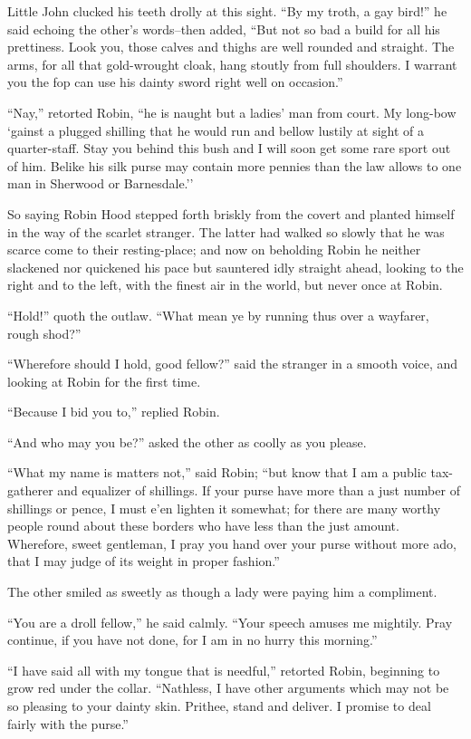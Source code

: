 Little John clucked his teeth drolly at this sight. ``By my troth, a gay
bird!'' he said echoing the other's words--then added, ``But not so bad
a build for all his prettiness. Look you, those calves and thighs are
well rounded and straight. The arms, for all that gold-wrought cloak,
hang stoutly from full shoulders. I warrant you the fop can use his
dainty sword right well on occasion.''

``Nay,'' retorted Robin, ``he is naught but a ladies' man from court. My
long-bow `gainst a plugged shilling that he would run and bellow lustily
at sight of a quarter-staff. Stay you behind this bush and I will soon
get some rare sport out of him. Belike his silk purse may contain more
pennies than the law allows to one man in Sherwood or Barnesdale.''

So saying Robin Hood stepped forth briskly from the covert and planted
himself in the way of the scarlet stranger. The latter had walked so
slowly that he was scarce come to their resting-place; and now on
beholding Robin he neither slackened nor quickened his pace but
sauntered idly straight ahead, looking to the right and to the left,
with the finest air in the world, but never once at Robin.

``Hold!'' quoth the outlaw. ``What mean ye by running thus over a
wayfarer, rough shod?''

``Wherefore should I hold, good fellow?'' said the stranger in a smooth
voice, and looking at Robin for the first time.

``Because I bid you to,'' replied Robin.

``And who may you be?'' asked the other as coolly as you please.

``What my name is matters not,'' said Robin; ``but know that I am a
public tax-gatherer and equalizer of shillings. If your purse have more
than a just number of shillings or pence, I must e'en lighten it
somewhat; for there are many worthy people round about these borders who
have less than the just amount. Wherefore, sweet gentleman, I pray you
hand over your purse without more ado, that I may judge of its weight in
proper fashion.''

The other smiled as sweetly as though a lady were paying him a
compliment.

``You are a droll fellow,'' he said calmly. ``Your speech amuses me
mightily. Pray continue, if you have not done, for I am in no hurry this
morning.''

``I have said all with my tongue that is needful,'' retorted Robin,
beginning to grow red under the collar. ``Nathless, I have other
arguments which may not be so pleasing to your dainty skin. Prithee,
stand and deliver. I promise to deal fairly with the purse.''

